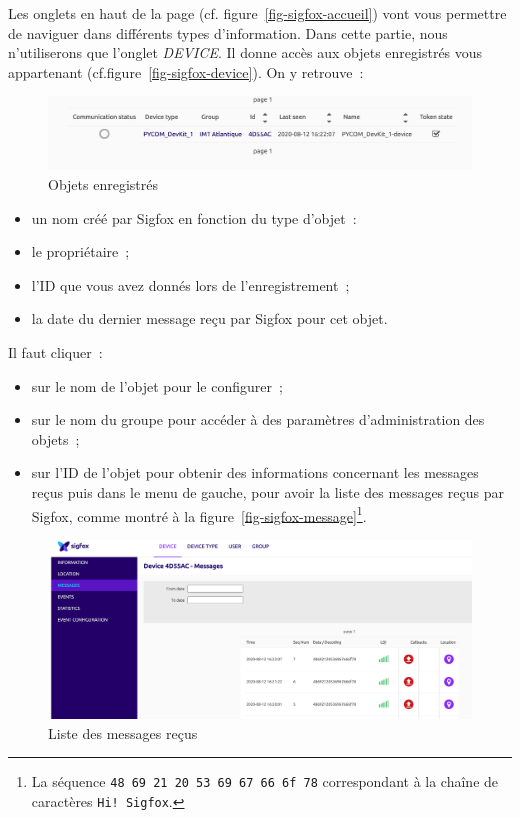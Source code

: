 Les onglets en haut de la page (cf. figure~\vref{fig-sigfox-accueil}) vont vous permettre de naviguer dans différents types d’information. Dans cette partie, nous n'utiliserons que l'onglet \textit{DEVICE}. Il donne accès aux objets enregistrés vous appartenant (cf.figure~\vref{fig-sigfox-device}). On y retrouve~:

\begin{figure}[tbp]
\centerline{\includegraphics[width=1\columnwidth]{Pictures/sigfox-device.png} }
\caption{Objets enregistrés}
\label{fig-sigfox-device}
\end{figure}

\begin{itemize}
    \item un nom créé par Sigfox en fonction du type d’objet~: 
    \item le propriétaire~;
    \item l’ID que vous avez donnés lors de l’enregistrement~;
    \item la date du dernier message reçu par Sigfox pour cet objet.
\end{itemize}

     \vspace{1em}

Il faut cliquer~:
\begin{itemize}
    \item sur le nom de l’objet pour le configurer~;
    \item sur le nom du groupe pour accéder à des paramètres d’administration des objets~;
    \item  sur l’ID de l’objet pour obtenir des informations concernant les messages reçus puis  dans le menu de gauche, pour avoir la liste des messages reçus par Sigfox, comme montré à la figure~\vref{fig-sigfox-message}\footnote{La séquence \texttt{48 69 21 20 53 69 67 66 6f 78} correspondant à la chaîne de caractères \texttt{Hi! Sigfox}.}.
\end{itemize}



\begin{figure}[tbp]
\centerline{\includegraphics[width=1\columnwidth]{Pictures/sigfox-message.png} }
\caption{Liste des messages reçus}
\label{fig-sigfox-message}
\end{figure}


